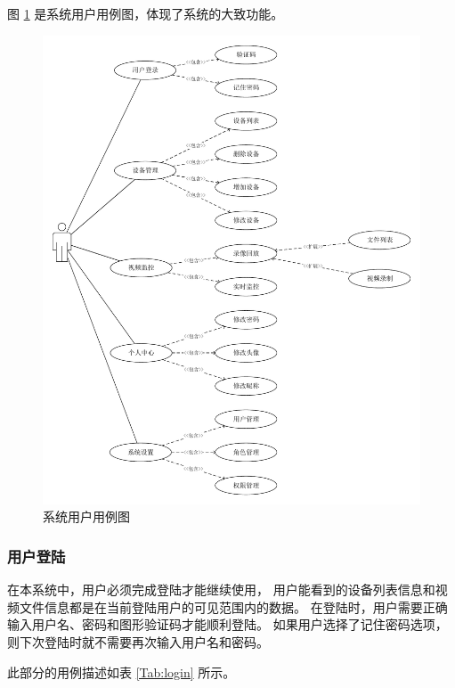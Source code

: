 图 \ref{Fig:case} 是系统用户用例图，体现了系统的大致功能。
\begin{figure}[ht]
    \centering   
    \includegraphics[scale=.5]{./Figure/IMG_case.pdf}
    \caption{系统用户用例图}\label{Fig:case}
\end{figure}

\subsubsection{用户登陆}
在本系统中，用户必须完成登陆才能继续使用，
用户能看到的设备列表信息和视频文件信息都是在当前登陆用户的可见范围内的数据。
在登陆时，用户需要正确输入用户名、密码和图形验证码才能顺利登陆。
如果用户选择了记住密码选项，则下次登陆时就不需要再次输入用户名和密码。

此部分的用例描述如表 \ref{Tab:login} 所示。

